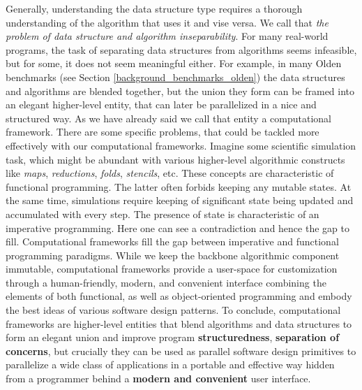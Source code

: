 \quad Generally, understanding the data structure type requires a thorough understanding of the algorithm that uses it and vise versa. We call that \textit{the problem of data structure and algorithm inseparability}. For many real-world programs, the task of separating data structures from algorithms seems infeasible, but for some, it does not seem meaningful either. For example, in many Olden benchmarks (see Section \ref{background_benchmarks_olden}) the data structures and algorithms are blended together, but the union they form can be framed into an elegant higher-level entity, that can later be parallelized in a nice and structured way. As we have already said we call that entity a computational framework.\newline\null
\quad There are some specific problems, that could be tackled more effectively with our computational frameworks. Imagine some scientific simulation task, which might be abundant with various higher-level algorithmic constructs like \textit{maps}, \textit{reductions}, \textit{folds}, \textit{stencils}, etc. These concepts are characteristic of functional programming. The latter often forbids keeping any mutable states. At the same time, simulations require keeping of significant state being updated and accumulated with every step. The presence of state is characteristic of an imperative programming. Here one can see a contradiction and hence the gap to fill. Computational frameworks fill the gap between imperative and functional programming paradigms. While we keep the backbone algorithmic component immutable, computational frameworks provide a user-space for customization through a human-friendly, modern, and convenient interface combining the elements of both functional, as well as object-oriented programming and embody the best ideas of various software design patterns.\newline\null
\quad To conclude, computational frameworks are higher-level entities that blend algorithms and data structures to form an elegant union and improve program \textbf{structuredness}, \textbf{separation of concerns}, but crucially they can be used as parallel software design primitives to parallelize a wide class of applications in a portable and effective way hidden from a programmer behind a \textbf{modern and convenient} user interface.
